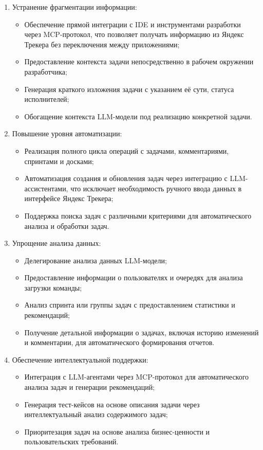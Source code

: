 \documentclass[utf8, russian]{eskdtext}
\begin{document}
\begin{enumerate}
\item{ Устранение фрагментации информации:}
\begin{itemize}
    \item Обеспечение прямой интеграции с IDE и инструментами разработки через MCP-протокол, что позволяет получать информацию из Яндекс Трекера без переключения между приложениями;
    \item Предоставление контекста задачи непосредственно в рабочем окружении разработчика;
    \item Генерация краткого изложения задачи с указанием её сути, статуса исполнителей;
    \item Обогащение контекста LLM-модели под реализацию конкретной задачи.
\end{itemize}

\item{ Повышение уровня автоматизации:}
\begin{itemize}
    \item Реализация полного цикла операций с задачами, комментариями, спринтами и досками;
    \item Автоматизация создания и обновления задач через интеграцию с LLM-ассистентами, что исключает необходимость ручного ввода данных в интерфейсе Яндекс Трекера;
    \item Поддержка поиска задач с различными критериями для автоматического анализа и обработки задач.
\end{itemize}

\item{ Упрощение анализа данных:}
\begin{itemize}
    \item Делегирование анализа данных LLM-модели;
    \item Предоставление информации о пользователях и очередях для анализа загрузки команды;
    \item Анализ спринта или группы задач с предоставлением статистики и рекомендаций;
    \item Получение детальной информации о задачах, включая историю изменений и комментарии, для автоматического формирования отчетов.
\end{itemize}

\item{ Обеспечение интеллектуальной поддержки:}
\begin{itemize}
    \item Интеграция с LLM-агентами через MCP-протокол для автоматического анализа задач и генерации рекомендаций;
    \item Генерация тест-кейсов на основе описания задачи через интеллектуальный анализ содержимого задач;
    \item Приоритезация задач на основе анализа бизнес-ценности и пользовательских требований.
\end{itemize}


\end{enumerate}
\end{document}
